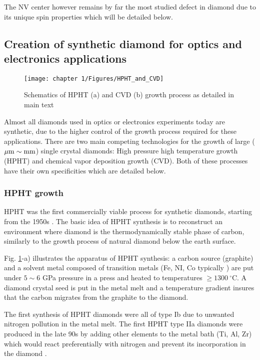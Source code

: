 \documentclass[a4paper, 11pt]{book}
\begin{document}
The NV center however remains by far the most studied defect in diamond due to its unique spin properties which will be detailed below.

\subsection{Creation of synthetic diamond for optics and electronics applications}
\begin{figure}[h!]
\centering
\texttt{[image: chapter 1/Figures/HPHT\_and\_CVD]}
\caption{Schematics of HPHT (a) and CVD (b) growth process as detailed in main text}
\label{HPHT and CVD}
\end{figure}

Almost all diamonds used in optics or electronics experiments today are synthetic, due to the higher control of the growth process required for these applications. There are two main competing technologies for the growth of large ($\mu \rm{m} \sim \rm{mm}$) single crystal diamonds: High pressure high temperature growth (HPHT) and chemical vapor deposition growth (CVD). Both of these processes have their own specificities which are detailed below.

\subsubsection{HPHT growth}

HPHT was the first commercially viable process for synthetic diamonds, starting from the 1950s \citep{barnard2000diamond, bundy1955man}. The basic idea of HPHT synthesis is to reconstruct an environment where diamond is the thermodynamically stable phase of carbon, similarly to the growth process of natural diamond below the earth surface. 

Fig. \ref{HPHT and CVD}-a) illustrates the apparatus of HPHT synthesis: a carbon source (graphite) and a solvent metal composed of transition metals (Fe, NI, Co typically \citep{bundy1963direct}) are put under $5 \sim 6$ GPa pressure in a press and heated to temperatures $\geq 1300\ ^\circ$C. A diamond crystal seed is put in the metal melt and a temperature gradient insures that the carbon migrates from the graphite to the diamond.

The first synthesis of HPHT diamonds were all of type Ib due to unwanted nitrogen pollution in the metal melt. The first HPHT type IIa diamonds were produced in the late 90s by adding other elements to the metal bath (Ti, Al, Zr) which would react preferentially with nitrogen and prevent its incorporation in the diamond \citep{burns1999growth, sumiya2002growth}.
\end{document}
